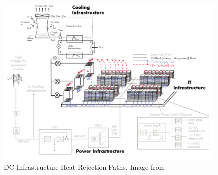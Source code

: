 \begin{figure} [!h]
\centering
\includegraphics[scale=.25]{methodology/images/dc_cooling.png}
\caption[Image of DC heat rejection paths]{DC Infrastructure Heat Rejection Paths. Image from \cite{shah11}}
\label{img_dc_infrastructure}
\end{figure}